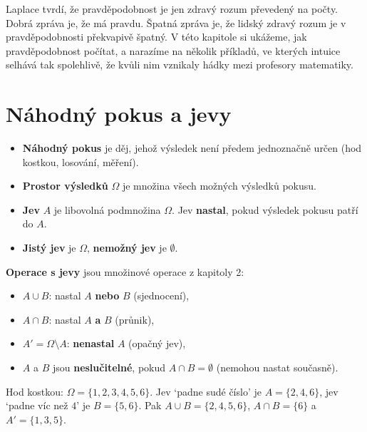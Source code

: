 \label{kap:pravdepodobnost}

Laplace tvrdí, že pravděpodobnost je jen zdravý rozum převedený na počty. Dobrá zpráva je, že má pravdu. Špatná zpráva je, že lidský zdravý rozum je v pravděpodobnosti překvapivě špatný. V této kapitole si ukážeme, jak pravděpodobnost počítat, a narazíme na několik příkladů, ve kterých intuice selhává tak spolehlivě, že kvůli nim vznikaly hádky mezi profesory matematiky.

\section{Náhodný pokus a jevy}\label{sec:nahodny-pokus}

\begin{definitionbox}
  \begin{itemize}
    \item \textbf{Náhodný pokus} je děj, jehož výsledek není předem jednoznačně určen (hod kostkou, losování, měření).
    \item \textbf{Prostor výsledků} $\Omega$ je množina všech možných výsledků pokusu.
    \item \textbf{Jev} $A$ je libovolná podmnožina $\Omega$. Jev \textbf{nastal}, pokud výsledek pokusu patří do $A$.
    \item \textbf{Jistý jev} je $\Omega$, \textbf{nemožný jev} je $\emptyset$.
  \end{itemize}

  \textbf{Operace s jevy} jsou množinové operace z kapitoly 2:
  \begin{itemize}
    \item $A\cup B$: nastal $A$ \textbf{nebo} $B$ (sjednocení),
    \item $A\cap B$: nastal $A$ \textbf{a} $B$ (průnik),
    \item $A' = \Omega\setminus A$: \textbf{nenastal} $A$ (opačný jev),
    \item $A$ a $B$ jsou \textbf{neslučitelné}, pokud $A\cap B = \emptyset$ (nemohou nastat současně).
  \end{itemize}
\end{definitionbox}

\begin{example}
  Hod kostkou: $\Omega = \{1, 2, 3, 4, 5, 6\}$. Jev `padne sudé číslo' je $A = \{2, 4, 6\}$, jev `padne víc než $4$' je $B = \{5, 6\}$. Pak $A\cup B = \{2, 4, 5, 6\}$, $A\cap B = \{6\}$ a $A' = \{1, 3, 5\}$.
\end{example}


